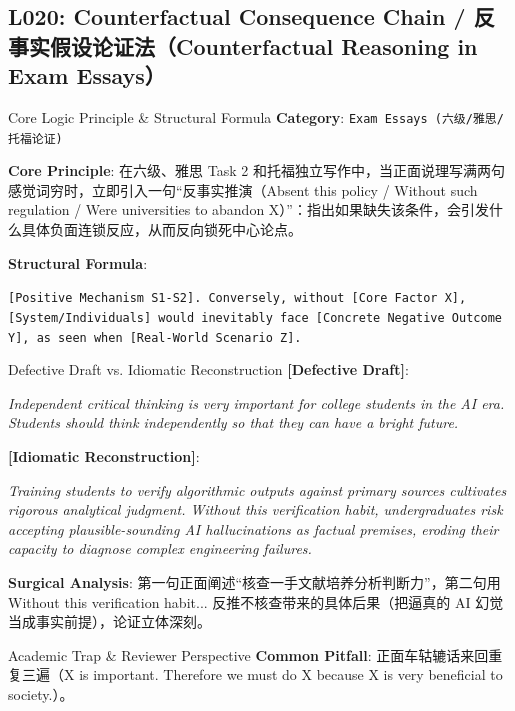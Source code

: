 \subsection{L020: Counterfactual Consequence Chain / 反事实假设论证法（Counterfactual Reasoning in Exam Essays）}\label{sec:logic:L020}
\begin{ConceptBox}{Core Logic Principle \& Structural Formula}
\textbf{Category}: \texttt{Exam Essays (六级/雅思/托福论证)}\par\vspace{3pt}
\textbf{Core Principle}: 在六级、雅思 Task 2 和托福独立写作中，当正面说理写满两句感觉词穷时，立即引入一句“反事实推演（Absent this policy / Without such regulation / Were universities to abandon X）”：指出如果缺失该条件，会引发什么具体负面连锁反应，从而反向锁死中心论点。\par\vspace{4pt}
\textbf{Structural Formula}:\par\noindent\texttt{[Positive Mechanism S1-S2]. Conversely, without [Core Factor X], [System/Individuals] would inevitably face [Concrete Negative Outcome Y], as seen when [Real-World Scenario Z].}
\end{ConceptBox}
\begin{ExampleBox}{Defective Draft vs. Idiomatic Reconstruction}
\textbf{\color{TargetHighlight}[Defective Draft]}:\par\textit{Independent critical thinking is very important for college students in the AI era. Students should think independently so that they can have a bright future.}\par\vspace{4pt}
\textbf{\color{AcadNavy}[Idiomatic Reconstruction]}:\par\textit{Training students to verify algorithmic outputs against primary sources cultivates rigorous analytical judgment. Without this verification habit, undergraduates risk accepting plausible-sounding AI hallucinations as factual premises, eroding their capacity to diagnose complex engineering failures.}\par\vspace{4pt}
\textbf{Surgical Analysis}: 第一句正面阐述“核查一手文献培养分析判断力”，第二句用 Without this verification habit... 反推不核查带来的具体后果（把逼真的 AI 幻觉当成事实前提），论证立体深刻。
\end{ExampleBox}
\begin{TipBox}{Academic Trap \& Reviewer Perspective}
\textbf{Common Pitfall}: 正面车轱辘话来回重复三遍（X is important. Therefore we must do X because X is very beneficial to society.）。
\end{TipBox}
\vspace{6pt}
